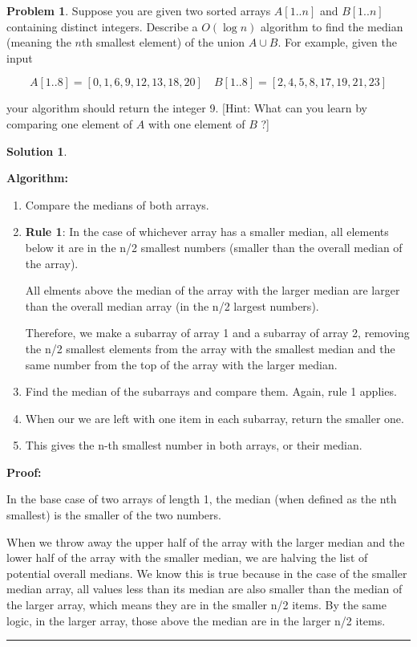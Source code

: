 \documentclass{article}
\theoremstyle{definition}
\newtheorem{problem}{Problem}
\def\fline{\rule{0.75\linewidth}{0.5pt}}
\newcommand{\finishline}{
  \begin{center}\fline
\end{center}}
\newtheorem*{solution*}{Solution}
\newenvironment{solution}{
\begin{solution*}}{{\finishline}
\end{solution*}}
\begin{document}
\newpage

\begin{problem}
  Suppose you are given two sorted arrays $A[1 . . n]$ and $B[1 . . n]$ containing distinct integers. Describe a $O(\log n)$ algorithm to find the median (meaning the $n$th smallest element) of the union $A \cup B$. For example, given the input

  $$
  A[1 . .8]=[0,1,6,9,12,13,18,20] \quad B[1 . .8]=[2,4,5,8,17,19,21,23]
  $$

  your algorithm should return the integer 9. [Hint: What can you learn by comparing one element of $A$ with one element of $B$ ?]

\end{problem}

\begin{solution}
  \

  \textbf{Algorithm:}
  \
  \begin{enumerate}
    \item Compare the medians of both arrays.
    \item \textbf{Rule 1}: In the case of whichever array has a smaller median, all elements below it are in the n/2 smallest numbers (smaller than the overall median of the array).

      All elments above the median of the array with the larger median are larger than the overall median array (in the n/2 largest numbers).

      Therefore, we make a subarray of array 1 and a subarray of array 2, removing the n/2 smallest elements from the array with the smallest median and the same number from the top of the array with the larger median.
    \item Find the median of the subarrays and compare them. Again, rule 1 applies.
    \item When our we are left with one item in each subarray, return the smaller one.
    \item This gives the n-th smallest number in both arrays, or their median.
  \end{enumerate}

  \textbf{Proof:}
  \

  In the base case of two arrays of length 1, the median (when defined as the nth smallest) is the smaller of the two numbers.

  When we throw away the upper half of the array with the larger median and the lower half of the array with the smaller median, we are halving the list of potential overall medians. We know this is true because in the case of the smaller median array, all values less than its median are also smaller than the median of the larger array, which means they are in the smaller n/2 items. By the same logic, in the larger array, those above the median are in the larger n/2 items.


\end{solution}
\end{document}
